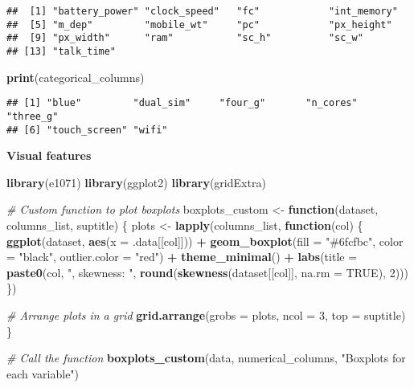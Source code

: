 \documentclass[
]{article}
\newenvironment{Shaded}{\begin{snugshade}}{\end{snugshade}}
\newcommand{\AttributeTok}[1]{\textcolor[rgb]{0.13,0.29,0.53}{#1}}
\newcommand{\CommentTok}[1]{\textcolor[rgb]{0.56,0.35,0.01}{\textit{#1}}}
\newcommand{\ConstantTok}[1]{\textcolor[rgb]{0.56,0.35,0.01}{#1}}
\newcommand{\ControlFlowTok}[1]{\textcolor[rgb]{0.13,0.29,0.53}{\textbf{#1}}}
\newcommand{\DecValTok}[1]{\textcolor[rgb]{0.00,0.00,0.81}{#1}}
\newcommand{\FunctionTok}[1]{\textcolor[rgb]{0.13,0.29,0.53}{\textbf{#1}}}
\newcommand{\NormalTok}[1]{#1}
\newcommand{\OtherTok}[1]{\textcolor[rgb]{0.56,0.35,0.01}{#1}}
\newcommand{\SpecialCharTok}[1]{\textcolor[rgb]{0.81,0.36,0.00}{\textbf{#1}}}
\newcommand{\StringTok}[1]{\textcolor[rgb]{0.31,0.60,0.02}{#1}}
\begin{document}
\begin{verbatim}
##  [1] "battery_power" "clock_speed"   "fc"            "int_memory"   
##  [5] "m_dep"         "mobile_wt"     "pc"            "px_height"    
##  [9] "px_width"      "ram"           "sc_h"          "sc_w"         
## [13] "talk_time"
\end{verbatim}

\begin{Shaded}
\begin{Highlighting}[]
\FunctionTok{print}\NormalTok{(categorical\_columns)}
\end{Highlighting}
\end{Shaded}

\begin{verbatim}
## [1] "blue"         "dual_sim"     "four_g"       "n_cores"      "three_g"     
## [6] "touch_screen" "wifi"
\end{verbatim}

\textbf{Visual features}

\begin{Shaded}
\begin{Highlighting}[]
\FunctionTok{library}\NormalTok{(e1071)}
\FunctionTok{library}\NormalTok{(ggplot2)}
\FunctionTok{library}\NormalTok{(gridExtra)}

\CommentTok{\# Custom function to plot boxplots}
\NormalTok{boxplots\_custom }\OtherTok{\textless{}{-}} \ControlFlowTok{function}\NormalTok{(dataset, columns\_list, suptitle) \{}
\NormalTok{  plots }\OtherTok{\textless{}{-}} \FunctionTok{lapply}\NormalTok{(columns\_list, }\ControlFlowTok{function}\NormalTok{(col) \{}
    \FunctionTok{ggplot}\NormalTok{(dataset, }\FunctionTok{aes}\NormalTok{(}\AttributeTok{x =}\NormalTok{ .data[[col]])) }\SpecialCharTok{+}
      \FunctionTok{geom\_boxplot}\NormalTok{(}\AttributeTok{fill =} \StringTok{"\#6fcfbc"}\NormalTok{, }\AttributeTok{color =} \StringTok{"black"}\NormalTok{, }\AttributeTok{outlier.color =} \StringTok{"red"}\NormalTok{) }\SpecialCharTok{+}
      \FunctionTok{theme\_minimal}\NormalTok{() }\SpecialCharTok{+}
      \FunctionTok{labs}\NormalTok{(}\AttributeTok{title =} \FunctionTok{paste0}\NormalTok{(col, }\StringTok{", skewness: "}\NormalTok{, }\FunctionTok{round}\NormalTok{(}\FunctionTok{skewness}\NormalTok{(dataset[[col]], }\AttributeTok{na.rm =} \ConstantTok{TRUE}\NormalTok{), }\DecValTok{2}\NormalTok{)))}
\NormalTok{  \})}
  
  \CommentTok{\# Arrange plots in a grid}
  \FunctionTok{grid.arrange}\NormalTok{(}\AttributeTok{grobs =}\NormalTok{ plots, }\AttributeTok{ncol =} \DecValTok{3}\NormalTok{, }\AttributeTok{top =}\NormalTok{ suptitle)}
\NormalTok{\}}

\CommentTok{\# Call the function}
\FunctionTok{boxplots\_custom}\NormalTok{(data, numerical\_columns, }\StringTok{"Boxplots for each variable"}\NormalTok{)}
\end{Highlighting}
\end{Shaded}
\end{document}
